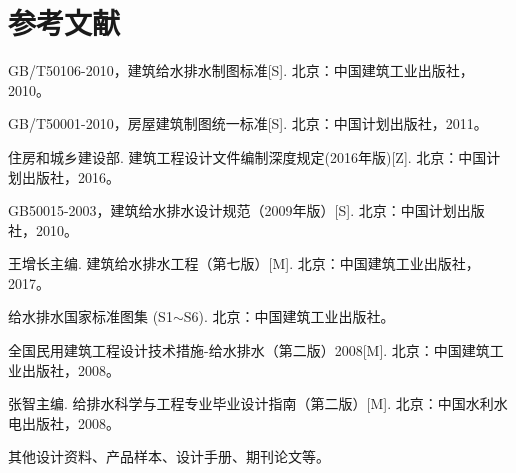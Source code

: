 \documentclass{gdutart}
\begin{document}
  \section*{参考文献}
    \begin{enumerate}[label={[\arabic*]}]
      \item GB/T50106-2010，建筑给水排水制图标准[S]. 北京：中国建筑工业出版社，2010。
      \item GB/T50001-2010，房屋建筑制图统一标准[S]. 北京：中国计划出版社，2011。
      \item 住房和城乡建设部. 建筑工程设计文件编制深度规定(2016年版)[Z]. 北京：中国计划出版社，2016。
      \item GB50015-2003，建筑给水排水设计规范（2009年版）[S]. 北京：中国计划出版社，2010。
      \item 王增长主编. 建筑给水排水工程（第七版）[M]. 北京：中国建筑工业出版社，2017。
      \item 给水排水国家标准图集 (S1$\sim$S6). 北京：中国建筑工业出版社。
      \item 全国民用建筑工程设计技术措施-给水排水（第二版）2008[M]. 北京：中国建筑工业出版社，2008。
      \item 张智主编. 给排水科学与工程专业毕业设计指南（第二版）[M]. 北京：中国水利水电出版社，2008。
      \item 其他设计资料、产品样本、设计手册、期刊论文等。
    \end{enumerate}
\end{document}

